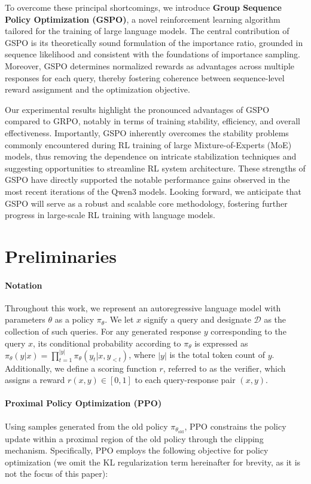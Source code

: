 To overcome these principal shortcomings, we introduce \textbf{Group Sequence Policy Optimization (GSPO)}, a novel reinforcement learning algorithm tailored for the training of large language models. The central contribution of GSPO is its theoretically sound formulation of the importance ratio, grounded in sequence likelihood \citep{click} and consistent with the foundations of importance sampling. Moreover, GSPO determines normalized rewards as advantages across multiple responses for each query, thereby fostering coherence between sequence-level reward assignment and the optimization objective.

Our experimental results highlight the pronounced advantages of GSPO compared to GRPO, notably in terms of training stability, efficiency, and overall effectiveness. Importantly, GSPO inherently overcomes the stability problems commonly encountered during RL training of large Mixture-of-Experts (MoE) models, thus removing the dependence on intricate stabilization techniques and suggesting opportunities to streamline RL system architecture. These strengths of GSPO have directly supported the notable performance gains observed in the most recent iterations of the Qwen3 models. Looking forward, we anticipate that GSPO will serve as a robust and scalable core methodology, fostering further progress in large-scale RL training with language models.

\section{Preliminaries}

\paragraph{Notation}
Throughout this work, we represent an autoregressive language model with parameters $\theta$ as a policy $\pi_\theta$. We let $x$ signify a query and designate $\mathcal{D}$ as the collection of such queries. For any generated response $y$ corresponding to the query $x$, its conditional probability according to $\pi_\theta$ is expressed as $\pi_\theta (y | x)=\prod_{t=1}^{|y|} \pi_\theta (y_t | x, y_{<t} )$, where $|y|$ is the total token count of $y$. Additionally, we define a scoring function $r$, referred to as the verifier, which assigns a reward $r(x, y) \in [0, 1]$ to each query-response pair $(x, y)$.

\paragraph{Proximal Policy Optimization (PPO)} Using samples generated from the old policy $\pi_{\theta_\text{old}}$, PPO \citep{ppo} constrains the policy update within a proximal region of the old policy through the clipping mechanism. Specifically, PPO employs the following objective for policy optimization (we omit the KL regularization term hereinafter for brevity, as it is not the focus of this paper):

